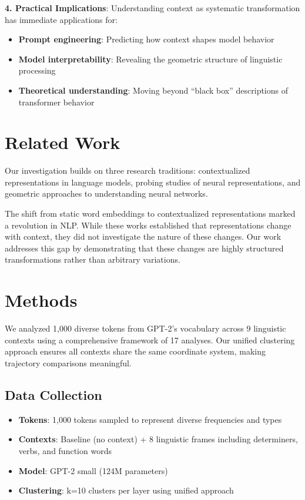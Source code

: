 \documentclass[11pt]{article}
\begin{document}
\textbf{4. Practical Implications}: Understanding context as systematic transformation has immediate applications for:
\begin{itemize}
    \item \textbf{Prompt engineering}: Predicting how context shapes model behavior
    \item \textbf{Model interpretability}: Revealing the geometric structure of linguistic processing  
    \item \textbf{Theoretical understanding}: Moving beyond ``black box'' descriptions of transformer behavior
\end{itemize}

\section{Related Work}

Our investigation builds on three research traditions: contextualized representations in language models, probing studies of neural representations, and geometric approaches to understanding neural networks.

The shift from static word embeddings to contextualized representations marked a revolution in NLP. While these works established that representations change with context, they did not investigate the nature of these changes. Our work addresses this gap by demonstrating that these changes are highly structured transformations rather than arbitrary variations.

\section{Methods}

We analyzed 1,000 diverse tokens from GPT-2's vocabulary across 9 linguistic contexts using a comprehensive framework of 17 analyses. Our unified clustering approach ensures all contexts share the same coordinate system, making trajectory comparisons meaningful.

\subsection{Data Collection}
\begin{itemize}
\item \textbf{Tokens}: 1,000 tokens sampled to represent diverse frequencies and types
\item \textbf{Contexts}: Baseline (no context) + 8 linguistic frames including determiners, verbs, and function words
\item \textbf{Model}: GPT-2 small (124M parameters) 
\item \textbf{Clustering}: k=10 clusters per layer using unified approach
\end{itemize}
\end{document}
